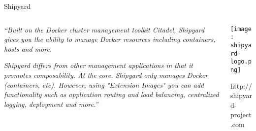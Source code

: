 \documentclass[presentation,c]{beamer}
\begin{document}
{
\begin{frame}[label=sec-11-2]{Shipyard}

\begin{columns}
\begin{column}{0.6\textwidth}

\textit{``Built on the Docker cluster management toolkit Citadel, Shipyard gives you the ability to manage Docker resources including containers, hosts and more.}

\textit{Shipyard differs from other management applications in that it promotes composability. At the core, Shipyard only manages Docker (containers, etc). However, using "Extension Images" you can add functionality such as application routing and load balancing, centralized logging, deployment and more.''}
\end{column}

\begin{column}{0.4\textwidth}
\texttt{[image: shipyard-logo.png]}

\small{http://shipyard-project.com}
\end{column}
\end{columns}
\end{frame}
} %

{
\begin{frame}[label=sec-11-3]{}
\end{frame}
} %
{
\begin{frame}[label=sec-11-4]{}
\end{frame}
} %
\end{document}

